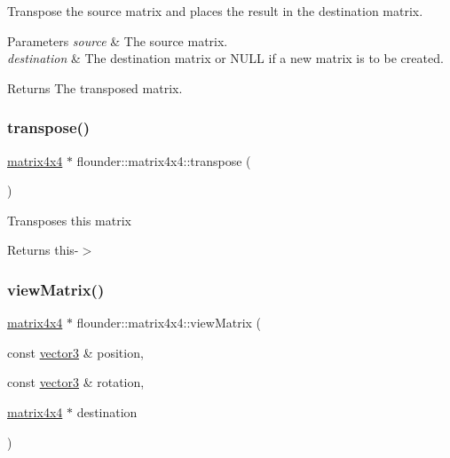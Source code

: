 Transpose the source matrix and places the result in the destination matrix. 


\begin{DoxyParams}{Parameters}
{\em source} & The source matrix. \\
\hline
{\em destination} & The destination matrix or N\+U\+LL if a new matrix is to be created. \\
\hline
\end{DoxyParams}
\begin{DoxyReturn}{Returns}
The transposed matrix. 
\end{DoxyReturn}
\mbox{\label{classflounder_1_1matrix4x4_aaf0d086f1d886d8aedd61c070f098344}} 
\subsubsection{\texorpdfstring{transpose()}{transpose()}\hspace{0.1cm}{\footnotesize\ttfamily [2/2]}}
{\footnotesize\ttfamily \hyperlink{classflounder_1_1matrix4x4}{matrix4x4} $\ast$ flounder\+::matrix4x4\+::transpose (\begin{DoxyParamCaption}{ }\end{DoxyParamCaption})}



Transposes this matrix 

\begin{DoxyReturn}{Returns}
this-\/$>$ 
\end{DoxyReturn}
\mbox{\label{classflounder_1_1matrix4x4_aee10976c10baabe8c69374ab64431cd4}} 
\subsubsection{\texorpdfstring{view\+Matrix()}{viewMatrix()}}
{\footnotesize\ttfamily \hyperlink{classflounder_1_1matrix4x4}{matrix4x4} $\ast$ flounder\+::matrix4x4\+::view\+Matrix (\begin{DoxyParamCaption}\item[{const \hyperlink{classflounder_1_1vector3}{vector3} \&}]{position,  }\item[{const \hyperlink{classflounder_1_1vector3}{vector3} \&}]{rotation,  }\item[{\hyperlink{classflounder_1_1matrix4x4}{matrix4x4} $\ast$}]{destination }\end{DoxyParamCaption})\hspace{0.3cm}{\ttfamily [static]}}



